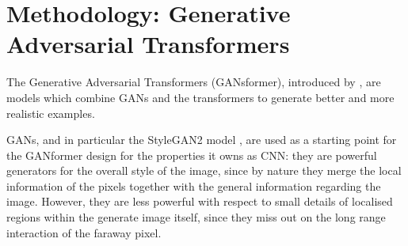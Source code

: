 \documentclass{article}
\begin{document}
%
%
%

\section{Methodology: Generative Adversarial Transformers}\label{sec:ganformer}

The Generative Adversarial Transformers (GANsformer), introduced by 
\citet{hudson2021generative}, are models which combine GANs and the transformers to 
generate 
better and more realistic examples.

GANs, and in particular the StyleGAN2 model \cite{karras2020analyzing}, are used as a starting point for the 
GANformer design for the properties it owns as CNN: they are powerful generators for the overall 
style of the image, since by nature they merge the local information of the pixels together with the 
general information regarding the image. 
However, they are less powerful with respect to small details of localised regions within the 
generate 
image itself, since they miss out on the long range interaction of the faraway pixel.
\end{document}
